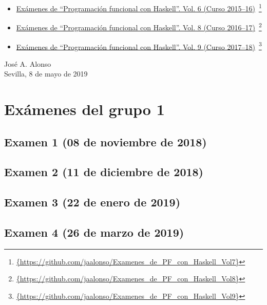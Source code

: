 \documentclass[a4paper,12pt,twoside]{book}
\begin{document}
\begin{itemize}
\item
  \href{https://github.com/jaalonso/Examenes_de_PF_con_Haskell_Vol7}
  {Exámenes de ``Programaci\'on funcional con Haskell''.
    Vol. 6 (Curso 2015--16)}\
    \footnote{\url{{https://github.com/jaalonso/Examenes_de_PF_con_Haskell_Vol7}}}

\item
  \href{https://github.com/jaalonso/Examenes_de_PF_con_Haskell_Vol8}
  {Exámenes de ``Programaci\'on funcional con Haskell''.
    Vol. 8 (Curso 2016--17)}\
    \footnote{\url{{https://github.com/jaalonso/Examenes_de_PF_con_Haskell_Vol8}}}

\item
  \href{https://github.com/jaalonso/Examenes_de_PF_con_Haskell_Vol9}
  {Exámenes de ``Programaci\'on funcional con Haskell''.
    Vol. 9 (Curso 2017--18)}\
    \footnote{\url{{https://github.com/jaalonso/Examenes_de_PF_con_Haskell_Vol9}}}

\end{itemize}
     
\begin{flushright}
  José A. Alonso \\
  Sevilla, 8 de mayo de 2019
\end{flushright}

\chapter{Exámenes del grupo 1}
\section{Examen 1 (08 de noviembre de 2018)}
\section{Examen 2 (11 de diciembre de 2018)}
\section{Examen 3 (22 de enero de 2019)}
 \label{examen_18_19_1_3}
\section{Examen 4 (26 de marzo de 2019)}
\end{document}
